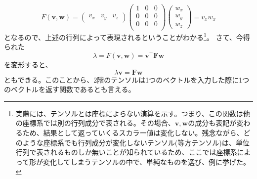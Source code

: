 \begin{equation}
	F(\boldsymbol{v},\boldsymbol{w}) =
	\begin{pmatrix}
		v_x & v_y & v_z
	\end{pmatrix}
	\begin{pmatrix}
		1 & 0 & 0 \\
		0 & 0 & 0 \\
		0 & 0 & 0 \\
	\end{pmatrix}
	\begin{pmatrix}
		w_x \\ w_y \\ w_z
	\end{pmatrix}
	= v_xw_x
\end{equation}
となるので、上述の行列によって表現されるということがわかる\footnote{実際には、テンソルとは座標によらない演算を示す。つまり、この関数は他の座標系では別の行列成分で表される。その場合、\(\boldsymbol{v},\boldsymbol{w}\)の成分も表記が変わるため、結果として返っていくるスカラー値は変化しない。残念ながら、どのような座標系でも行列成分が変化しないテンソル(等方テンソル)は、単位行列で表されるものしか無いことが知られているため、ここでは座標系によって形が変化してしまうテンソルの中で、単純なものを選び、例に挙げた。}。
さて、今得られた
\begin{equation}
	\lambda =F(\boldsymbol{v},\boldsymbol{w}) =
	\boldsymbol{v}^{\top}\boldsymbol{F}\boldsymbol{w}
\end{equation}
を変形すると、
\begin{equation}
	\lambda\boldsymbol{v}  =
	\boldsymbol{F}\boldsymbol{w}
\end{equation}
ともできる。このことから、2階のテンソルは1つのベクトルを入力した際に1つのベクトルを返す関数であるとも言える。
